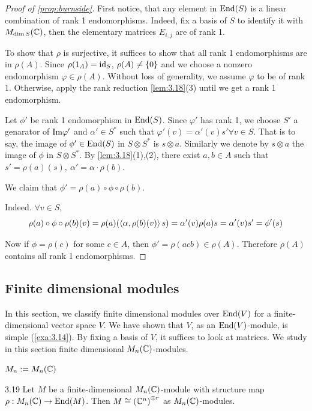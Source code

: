 \documentclass[twoside = false,	%
		headsepline,		%
		parskip = true,
		]{scrbook}						%
\begin{document}
    \begin{proof}[Proof of \ref{prop:burnside}]
        First notice, that any element in $\mathrm{End}(S)$ is a linear combination of rank 1 endomorphisms. Indeed, fix a basis of $S$ to identify it with $M_{\dim S}(\mathbb C)$, then the elementary matrices $E_{i,j}$ are of rank 1.

        To show that $\rho$ is surjective, it suffices to show that all rank 1 endomorphisms are in $\rho(A)$.
        Since $\rho(1_A)=\mathrm{id}_S$, $\rho(A)\neq\left\{ 0\right\}$ and we choose a nonzero endomorphism $\varphi\in\rho(A)$. Without loss of generality, we assume $\varphi$ to be of rank 1. Otherwise, apply the rank reduction \ref{lem:3.18}(3) until we get a rank 1 endomorphism.

        Let $\phi'$ be rank 1 endomorphism in $\mathrm{End}(S)$. Since $\varphi'$ has rank 1, we choose $S'$ a genarator of $\mathrm{Im} \varphi'$ and $\alpha'\in S^*$ such that $\varphi'(v) = \alpha'(v)s' \forall v\in S$. That is to say, the image of $\phi'\in\mathrm{End}(S)$ in $S\otimes S^*$ is $s\otimes a$. Similarly we denote by $s\otimes a$ the image of $\phi$ in $S\otimes S^*$. By \ref{lem:3.18}(1),(2), there exist $a,b \in A$ such that $s'=\rho(a)(s), \ \alpha'=\alpha \cdot \rho(b)$.

        We claim that $\phi'=\rho(a)\circ \phi \circ \rho(b)$.

        Indeed. $\forall v \in S$, $$\rho(a)\circ \phi \circ \rho(b)(v) = \rho(a)(\left\langle \alpha, \rho(b)(v)\right\rangle s) = \alpha'(v)\rho(a)s = \alpha'(v)s' = \phi'(s)$$

        Now if $\phi=\rho(c)$ for some $c\in A$, then $\phi'=\rho(acb)\in \rho(A)$. Therefore $\rho(A)$ contains all rank 1 endomorphisms.
    \end{proof}

    \subsection{Finite dimensional modules}

    In this section, we classify finite dimensional modules over $\mathrm{End}(V)$ for a finite-dimensional vector space $V$. We have shown that $V$, as an $\mathrm{End}(V)$-module, is simple (\ref{exa:3.14}).
    By fixing a basis of $V$, it suffices to look at matrices.
    We study in this section finite dimensional $M_n(\mathbb C)$-modules.

    \begin{notation*}{}
        $M_n := M_n(\mathbb C)$
    \end{notation*}
    \begin{proposition}{}{3.19}
        Let $M$ be a finite-dimensional $M_n(\mathbb C)$-module with structure map $\rho: M_n(\mathbb C) \to \mathrm{End}(M)$. Then $M \cong \left( \mathbb C^n\right)^{\oplus r}$ as $M_n(\mathbb C)$-modules.
    \end{proposition}
\end{document}
